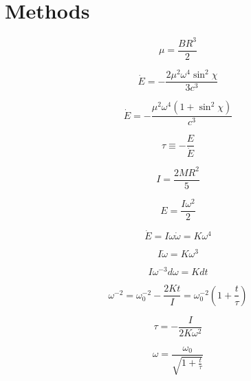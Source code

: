 \chapter{Methods}
\label{ch:methods}

\begin{equation}
	\mu = \frac{BR^3}{2}
\end{equation}

\begin{equation}
	\dot{E} = -\frac{2\mu^2\omega^4 \sin^2 \!\chi}{3c^3}
\end{equation}

\begin{equation}
	\dot{E} = -\frac{\mu^2\omega^4 \left(1 + \sin^2 \!\chi \right)}{c^3}
\end{equation}

\begin{equation}
	\tau \equiv -\frac{E}{\dot{E}}
\end{equation}

\begin{equation}
	I = \frac{2 M R^2}{5}
\end{equation}

\begin{equation}
	E = \frac{I\omega^2}{2}
\end{equation}

\begin{equation}
	\dot{E} = I \omega\dot{\omega} = K \omega^4
\end{equation}

\begin{equation}
	I \dot{\omega} = K \omega^3
\end{equation}

\begin{equation}
	I \omega^{-3} d\omega = K dt
\end{equation}

\begin{equation}
	\omega^{-2} = \omega_0^{-2} - \frac{2Kt}{I} = \omega_0^{-2} \left( 1 + \frac{t}{\tau} \right)
\end{equation}

\begin{equation}
	\tau = - \frac{I}{2K\omega^2}
\end{equation}

\begin{equation}
	\omega = \frac{\omega_0}{\sqrt{1 + \frac{t}{\tau}}}
\end{equation}


